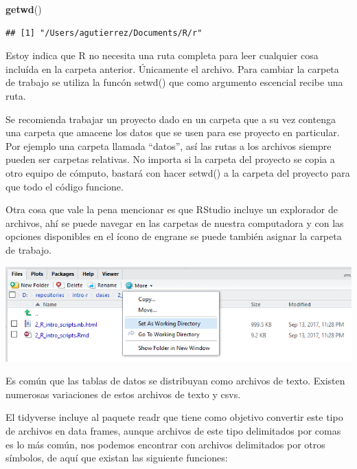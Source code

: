\documentclass[]{book}
\newenvironment{Shaded}{\begin{snugshade}}{\end{snugshade}}
\newcommand{\KeywordTok}[1]{\textcolor[rgb]{0.13,0.29,0.53}{\textbf{#1}}}
\newcommand{\NormalTok}[1]{#1}
\theoremstyle{definition}
\theoremstyle{definition}
\theoremstyle{definition}
\theoremstyle{remark}
\begin{document}
\begin{Shaded}
\begin{Highlighting}[]
\KeywordTok{getwd}\NormalTok{()}
\end{Highlighting}
\end{Shaded}

\begin{verbatim}
## [1] "/Users/agutierrez/Documents/R/r"
\end{verbatim}

Estoy indica que R no necesita una ruta completa para leer cualquier
cosa incluída en la carpeta anterior. Únicamente el archivo. Para
cambiar la carpeta de trabajo se utiliza la funcón setwd() que como
argumento escencial recibe una ruta.

Se recomienda trabajar un proyecto dado en un carpeta que a su vez
contenga una carpeta que amacene los datos que se usen para ese proyecto
en particular. Por ejemplo una carpeta llamada ``datos'', así las rutas
a los archivos siempre pueden ser carpetas relativas. No importa si la
carpeta del proyecto se copia a otro equipo de cómputo, bastará con
hacer setwd() a la carpeta del proyecto para que todo el código
funcione.

Otra cosa que vale la pena mencionar es que RStudio incluye un
explorador de archivos, ahí se puede navegar en las carpetas de nuestra
computadora y con las opciones disponibles en el ícono de engrane se
puede también asignar la carpeta de trabajo.

\includegraphics[width=10.24in]{./imagenes/3_setwd}

Es común que las tablas de datos se distribuyan como archivos de texto.
Existen numerosas variaciones de estos archivos de texto y csvs.

El tidyverse incluye al paquete readr que tiene como objetivo convertir
este tipo de archivos en data frames, aunque archivos de este tipo
delimitados por comas es lo más común, nos podemos encontrar con
archivos delimitados por otros símbolos, de aquí que existan las
siguiente funciones:
\end{document}
